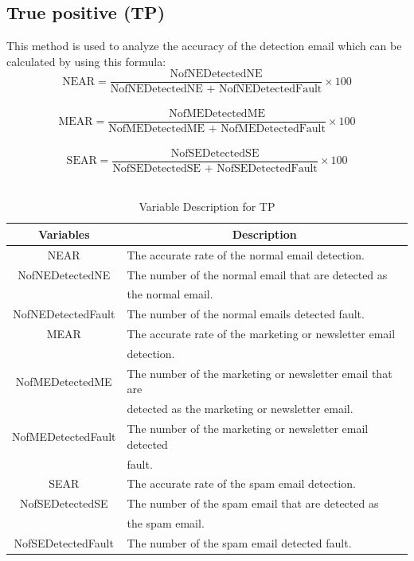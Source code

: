 \documentclass[conference]{IEEEtran}
\begin{document}
\subsection{True positive (TP)}

This method is used to analyze the accuracy of the detection email which can be calculated by using this formula:\\
$$ \text{NEAR} =  \frac{\text{NofNEDetectedNE}}{\text{NofNEDetectedNE + NofNEDetectedFault}} \times 100 $$\\
$$ \text{MEAR} =  \frac{\text{NofMEDetectedME}}{\text{NofMEDetectedME + NofMEDetectedFault}} \times 100 $$\\
$$ \text{SEAR} =  \frac{\text{NofSEDetectedSE}}{\text{NofSEDetectedSE + NofSEDetectedFault}} \times 100 $$\\

\begin{table}[!t]
\renewcommand{\arraystretch}{1.2}
\caption{Variable Description for TP}
\label{table_variableTP}
\centering
\begin{tabular}{c|l}
\hline
\bfseries Variables & \multicolumn{1}{c}{\bfseries Description}\\
\hline
NEAR & The accurate rate of the normal email detection.\\
\hline
NofNEDetectedNE & The number of the normal email that are detected as \\ & the normal email.\\
\hline
NofNEDetectedFault & The number of the normal emails detected fault.\\
\hline
MEAR & The accurate rate of the marketing or newsletter email \\ & detection.\\
\hline
NofMEDetectedME & The number of the marketing or newsletter email that are \\ & detected as the marketing or newsletter email.\\
\hline
NofMEDetectedFault & The number of the marketing or newsletter email detected \\ & fault.\\
\hline
SEAR & The accurate rate of the spam email detection.\\
\hline
NofSEDetectedSE & The number of the spam email that are detected as\\ & the spam email.\\
\hline
NofSEDetectedFault & The number of the spam email detected fault.\\
\hline
\end{tabular}
\end{table}
\end{document}
